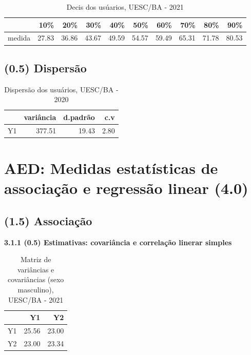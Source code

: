 \documentclass[12pt]{article}\usepackage[]{graphicx}\usepackage[]{color}
\begin{document}
\begin{table}[!ht]
  \centering
  \caption{Decis dos usúarios, UESC/BA - 2021}
  \begin{tabular}{rrrrrrrrrr}
  \hline
 & 10\% & 20\% & 30\% & 40\% & 50\% & 60\% & 70\% & 80\% & 90\% \\ 
  \hline
medida & 27.83 & 36.86 & 43.67 & 49.59 & 54.57 & 59.49 & 65.31 & 71.78 & 80.53 \\ 
   \hline
\end{tabular}
\end{table}
\clearpage
\subsection{(0.5) Dispersão}

\begin{table}[!ht]
    \centering
    \caption{Dispersão dos usuários, UESC/BA - 2020}
    \centering
  \begin{tabular}{rrrr}
    \hline
   & variância & d.padrão & c.v \\ 
    \hline
  Y1 & 377.51 & 19.43 & 2.80 \\
     \hline
  \end{tabular}
\end{table}
 \clearpage
 
 \section{AED: Medidas estatísticas de associação e regressão linear (4.0)}
 \subsection{(1.5) Associação}

  \textbf{3.1.1 (0.5) Estimativas: covariância e correlação linerar simples }
  

\begin{table}[!ht]
    \centering
    \caption{Matriz de variâncias e covariâncias (sexo masculino), UESC/BA - 2021}
    \begin{tabular}{rrr}
    \hline
    & Y1 & Y2 \\ 
    \hline
    Y1 & 25.56 & 23.00 \\ 
    Y2 & 23.00 & 23.34 \\ 
     \hline
  \end{tabular}
\end{table}
\end{document}
